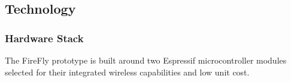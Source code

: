 \documentclass[journal, onecolumn]{IEEEtran}
\begin{document}

\subsection{Technology}

\subsubsection{Hardware Stack}
The FireFly prototype is built around two Espressif microcontroller modules selected for their integrated wireless capabilities and low unit cost.
\end{document}
